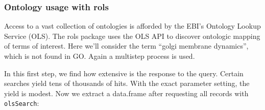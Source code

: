 \begin{shaded}
\begin{Highlighting}[]
\OperatorTok{|}\ErrorTok{\textgreater{}}\StringTok{ }\OperatorTok{::}\OperatorTok{==}\NormalTok{) }\OperatorTok{|}\ErrorTok{\textgreater{}}\StringTok{ }\OperatorTok{|}\ErrorTok{\textgreater{}}\StringTok{ }\NormalTok{()}
\end{Highlighting}
\end{shaded}

\subsubsection{Ontology usage with rols}\label{ontology-usage-with-rols}

Access to a vast collection of ontologies is afforded by the EBI's
Ontology Lookup Service (OLS). The rols package uses the OLS API
to discover ontologic mapping of terms of interest. Here we'll
consider the term ``golgi membrane dynamics'', which is not found in GO.
Again a multistep process is used.

\begin{shaded}
\begin{Highlighting}[]
\StringTok{ }\NormalTok{(}\NormalTok{, }\NormalTok{)}
\end{Highlighting}
\end{shaded}

In this first step, we find how extensive is the response
to the query. Certain searches yield tens of thousands of hits.
With the exact parameter setting, the yield is modest.
Now we extract a data.frame after requesting all
records with \texttt{olsSearch}:

\begin{shaded}
\begin{Highlighting}[]
\StringTok{ }
\StringTok{ }\NormalTok{)}
\OperatorTok{$}\StringTok{ }\OperatorTok{$}
\NormalTok{(lk3[,}\OperatorTok{:}\NormalTok{], }\NormalTok{) }\OperatorTok{|}\ErrorTok{\textgreater{}}\StringTok{ }\NormalTok{(}\NormalTok{, }\NormalTok{) }\OperatorTok{|}\ErrorTok{\textgreater{}}\StringTok{ }\NormalTok{(}\NormalTok{,}
  \NormalTok{)}
\end{Highlighting}
\end{shaded}

